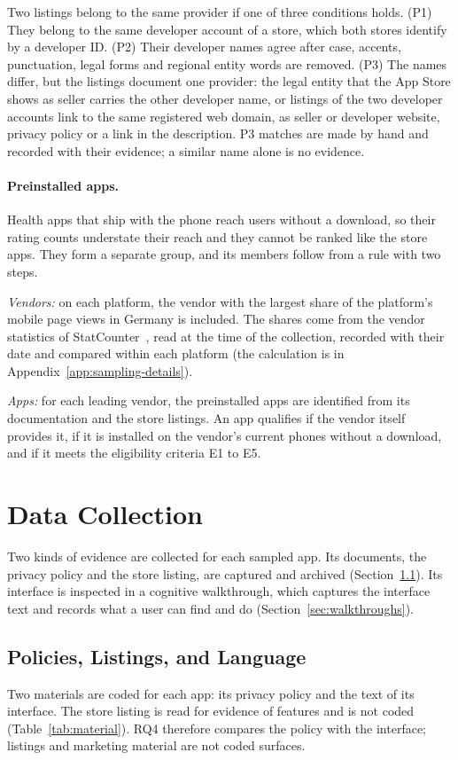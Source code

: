 Two listings belong to the same provider if one of three conditions holds.
(P1) They belong to the same developer account of a store, which both stores
identify by a developer ID\@. (P2) Their developer names agree after case,
accents, punctuation, legal forms and regional entity words are removed.
(P3) The names differ, but the listings document one provider: the legal entity
that the App Store shows as seller carries the other developer name, or
listings of the two developer accounts link to the same registered web domain,
as seller or developer website, privacy policy or a link in the description.
P3 matches are made by hand and recorded with their evidence; a similar name alone is no
evidence.

\paragraph{Preinstalled apps.} Health apps that ship with the phone reach
users without a download, so their rating counts understate their reach and
they cannot be ranked like the store apps. They form a separate group, and
its members follow from a rule with two steps.

\emph{Vendors:} on each platform, the vendor with the largest share of the
platform's mobile page views in Germany is included. The shares come from the
vendor statistics of StatCounter~\parencite{statcounter2026vendor}, read at the
time of the collection, recorded with their date and compared within each platform
(the calculation is in Appendix~\ref{app:sampling-details}).

\emph{Apps:} for each leading vendor, the preinstalled apps are identified from
its documentation and the store listings. An app qualifies if the vendor itself
provides it, if it is installed on the vendor's current phones without a
download, and if it meets the eligibility criteria E1 to E5.

\section{Data Collection}
\label{sec:collection}
Two kinds of evidence are collected for each sampled app. Its documents, the privacy policy and
the store listing, are captured and archived (Section~\ref{sec:material}). Its interface is
inspected in a cognitive walkthrough, which captures the interface text and records what a user
can find and do (Section~\ref{sec:walkthroughs}).

\subsection{Policies, Listings, and Language}
\label{sec:material}
Two materials are coded for each app: its privacy policy and the text of its
interface. The store listing is read for evidence of features and is not coded
(Table~\ref{tab:material}). RQ4 therefore compares the policy with the interface; listings
and marketing material are not coded surfaces.

